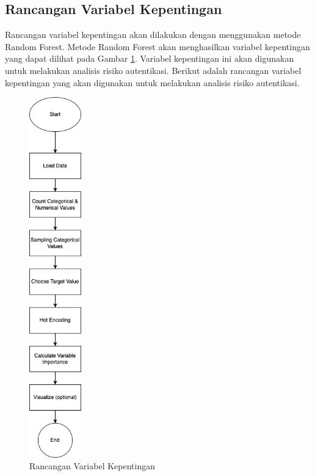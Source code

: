 \subsection{Rancangan Variabel Kepentingan}
Rancangan variabel kepentingan akan dilakukan dengan menggunakan metode Random Forest. Metode Random Forest akan menghasilkan variabel kepentingan yang dapat dilihat pada Gambar \ref{fig:variabel-kepentingan}. Variabel kepentingan ini akan digunakan untuk melakukan analisis risiko autentikasi.
Berikut adalah rancangan variabel kepentingan yang akan digunakan untuk melakukan analisis risiko autentikasi.
\begin{figure}[H]
    \centering
    \includegraphics[width=0.2\textwidth]{contents/chapter-4/vim.drawio.png}
    \caption{Rancangan Variabel Kepentingan}
    \label{fig:variabel-kepentingan}
\end{figure}

